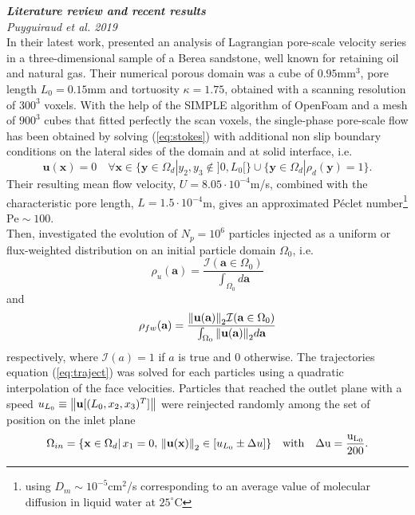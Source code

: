 \textit{\textbf{Literature review and recent results}}\\
\textit{Puyguiraud et al. 2019}\\
In their latest work, \citet{Puyguiraud2019} presented an analysis of Lagrangian pore-scale velocity series in a three-dimensional sample of a Berea sandstone, well known for retaining oil and natural gas.
Their numerical porous domain was a cube of $0.95$mm$^3$, pore length $L_0=0.15$mm and tortuosity $\kappa=1.75$, obtained with a scanning resolution of $300^3$ voxels. 
With the help of the SIMPLE algorithm of OpenFoam and a mesh of $900^3$ cubes that fitted perfectly the scan voxels, the single-phase pore-scale flow has been obtained by solving (\ref{eq:stokes}) with additional non slip boundary conditions on the lateral sides of the domain and at solid interface, i.e.
\begin{equation}\label{eq:nonslip_sideBC}
\textbf{u}(\textbf{x})=0 \quad\forall \textbf{x}\in \{\textbf{y}\in\Omega_d|y_2,y_3\notin]0,L_0[\}\cup\{\textbf{y}\in\Omega_d|\rho_d(\textbf{y})=1\}.
\end{equation}
Their resulting mean flow velocity, $U=8.05\cdot 10^{-4}$m/s, combined with the characteristic pore length, $L=1.5\cdot10^{-4}$m, gives an approximated Péclet number\footnote{using $D_m\sim10^{-5}$cm$^2$/s corresponding to an average value of molecular diffusion in liquid water at $25^\circ$C} $\mathrm{Pe}\sim100$. \\
Then, \citeauthor{Puyguiraud2019} investigated the evolution of $N_p=10^6$ particles injected as a uniform or flux-weighted distribution on an initial particle domain $\Omega_0$, i.e.
\begin{equation}\label{eq:unif_distr}
\rho_u(\textbf{a})=\frac{\mathcal{I}(\textbf{a}\in\Omega_0)}{\int_{\Omega_0} d\textbf{a}}
\end{equation}
and
\begin{equation}\label{eq:flux_weighted}
\rho_{fw}(\textbf{a})=\frac{\norm{\textbf{u}(\textbf{a})}_2\mathcal{I}(\textbf{a}\in\Omega_0)}{\int_{\Omega_0} \norm{\textbf{u}(\textbf{a})}_2 d\textbf{a}}
\end{equation}
respectively, where $\mathcal{I}(a)=1$ if $a$ is true and $0$ otherwise. 
The trajectories equation (\ref{eq:traject}) was solved for each particles using a quadratic interpolation of the face velocities.
Particles that reached the outlet plane with a speed $u_{L_0}\equiv\norm{\textbf{u}[(L_0,x_2,x_3)^T]}$ were reinjected randomly among the set of position on the inlet plane
\[
\Omega_{in}=\{\textbf{x}\in\Omega_d|\,x_1=0,\,\norm{\textbf{u}(\textbf{x})}_2\in[u_{L_0}\pm\Delta u]\}\quad\rm{with}\quad \Delta u=\frac{u_{L_0}}{200}.
\]
